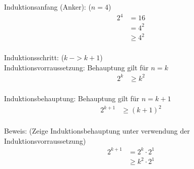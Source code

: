\documentclass[]{article}
\begin{document}
Induktionsanfang (Anker): ($n=4$)
\begin{align*}
	 && 2^4 &= 16 &&\\
	 &&  &= 4^2 &&\\
	 &&  &\geq 4^2 &&\\
\end{align*}

Induktionsschritt: ($k~ -> k+1$)\\
Induktionsvorraussetzung: Behauptung gilt für $n=k$\\
\begin{align*}
	 && 2^k &\geq k^2 &&\\
\end{align*}

Induktionsbehauptung: Behauptung gilt für $n=k+1$\\
\begin{align*}
	 && 2^{k+1} &\geq (k+1)^2 &&\\
\end{align*}

Beweis: (Zeige Induktionsbehauptung unter verwendung der Induktionsvorraussetzung)\\
\begin{align*}
	 && 2^{k+1} &= 2^k \cdot 2^1 &&\\
	 && &\geq k^2 \cdot 2^1 &&\\
\end{align*}
\end{document}
